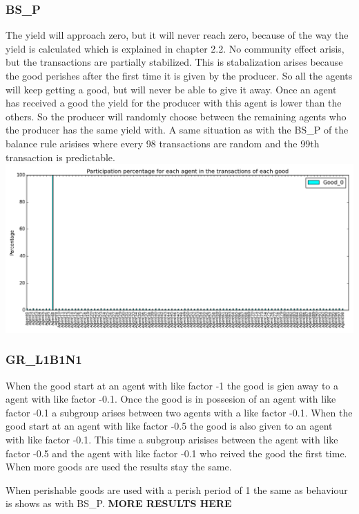 \documentclass[twoside,openright]{uva-bachelor-thesis}
\begin{document}
\subsubsection{BS\_P}
The yield will approach zero, but it will never reach zero, because of the way the yield is calculated which is explained in chapter 2.2. No community effect arisis, but the transactions are partially stabilized. This is stabalization arises because the good perishes after the first time it is given by the producer. So all the agents will keep getting a good, but will never be able to give it away. Once an agent has received a good the yield for the producer with this agent is lower than the others. So the producer will randomly choose between the remaining agents who the producer has the same yield with. A same situation as with the BS\_P of the balance rule arisises where every 98 transactions are random and the 99th transaction is predictable.
\includegraphics[scale=0.4]{Simulation_figures/GR_BS_P/Figure1_10k}

\subsubsection{GR\_L1B1N1}
When the good start at an agent with like factor -1 the good is gien away to a agent with like factor -0.1. Once the good is in possesion of an agent with like factor -0.1 a subgroup arises between two agents with a like factor -0.1. When the good start at an agent with like factor -0.5 the good is also given to an agent with like factor -0.1. This time a subgroup arisises between the agent with like factor -0.5 and the agent with like factor -0.1 who reived the good the first time. When more goods are used the results stay the same.

When perishable goods are used with a perish period of 1 the same as behaviour is shows as with BS\_P. \textbf{MORE RESULTS HERE}
\end{document}
